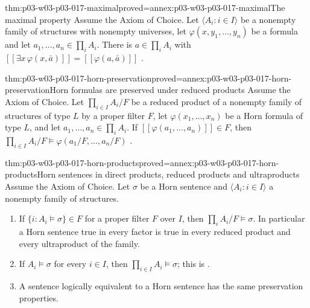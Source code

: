 \begin{hblemma}{thm:p03-w03-p03-017-maximal}{proved=annex:p03-w03-p03-017-maximal}{The maximal property}
Assume the Axiom of Choice.  Let \(\langle A_i:i\in I\rangle\) be a nonempty
family of structures with nonempty universes, let
\(\varphi(x,y_1,\ldots,y_n)\) be a formula and let
\(a_1,\ldots,a_n\in\prod_iA_i\).  There is \(a\in\prod_iA_i\) with
\([\![\exists x\,\varphi(x,\bar a)]\!]=[\![\varphi(a,\bar a)]\!]\)
\cite[V\S2, Lemma~2.6, p.~207]{BurrisSankappanavar2012}.
\end{hblemma}

\begin{hbtheorem}{thm:p03-w03-p03-017-horn-preservation}{proved=annex:p03-w03-p03-017-horn-preservation}{Horn formulas are preserved under reduced products}
Assume the Axiom of Choice.  Let \(\prod_{i\in I}A_i/F\) be a reduced
product of a nonempty family of structures of type \(L\) by a proper filter
\(F\), let \(\varphi(x_1,\ldots,x_n)\) be a Horn formula of type \(L\), and
let \(a_1,\ldots,a_n\in\prod_iA_i\).  If
\([\![\varphi(a_1,\ldots,a_n)]\!]\in F\), then
\(\prod_{i\in I}A_i/F\models\varphi(a_1/F,\ldots,a_n/F)\)
\cite[V\S2, Theorem~2.7, pp.~207--210]{BurrisSankappanavar2012}.
\end{hbtheorem}

\begin{hbcorollary}{thm:p03-w03-p03-017-horn-products}{proved=annex:p03-w03-p03-017-horn-products}{Horn sentences in direct products, reduced products and ultraproducts}
Assume the Axiom of Choice.  Let \(\sigma\) be a Horn sentence and
\(\langle A_i:i\in I\rangle\) a nonempty family of structures.
\begin{enumerate}
  \item If \(\{i:A_i\models\sigma\}\in F\) for a proper filter \(F\) over
        \(I\), then \(\prod_iA_i/F\models\sigma\).  In particular a Horn
        sentence true in every factor is true in every reduced product and
        every ultraproduct of the family.
  \item If \(A_i\models\sigma\) for every \(i\in I\), then
        \(\prod_{i\in I}A_i\models\sigma\); this is
        \cite[V\S1, Exercise~30, p.~204]{BurrisSankappanavar2012}.
  \item A sentence logically equivalent to a Horn sentence has the same
        preservation properties.
\end{enumerate}
\end{hbcorollary}


